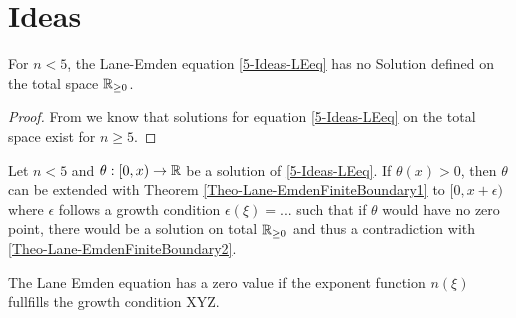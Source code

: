\section{Ideas}

%
%
%
\begin{theorem}
	\label{Theo-Lane-EmdenFiniteBoundary2}
	For $n<5$, the Lane-Emden equation \ref{5-Ideas-LEeq} has no Solution defined on the total space $\mathbb{R}_{\geq0}$.
\end{theorem}
\begin{proof}
	From \cite{quittnerSuperlinearParabolicProblems2007a} we know that solutions for equation \ref{5-Ideas-LEeq} on the total space exist for $n\geq5$.
	
\end{proof}
%
%
%
\begin{theorem}
	\label{Theo-Lane-EmdenFiniteBoundary3}
	Let $n<5$ and $\theta:[0,x)\rightarrow\mathbb{R}$ be a solution of \ref{5-Ideas-LEeq}. If $\theta(x)>0$, then $\theta$ can be extended with Theorem \ref{Theo-Lane-EmdenFiniteBoundary1} 
	to $[0,x+\epsilon)$ where $\epsilon$ follows a growth condition $\epsilon(\xi)=...$ such that if $\theta$ would have no zero point, there would be a solution on total 
	$\mathbb{R}_{\geq0}$ and thus a contradiction with \ref{Theo-Lane-EmdenFiniteBoundary2}.
\end{theorem}
\begin{theorem}
	The Lane Emden equation has a zero value if the exponent function $n(\xi)$ fullfills the growth condition XYZ.
\end{theorem}

